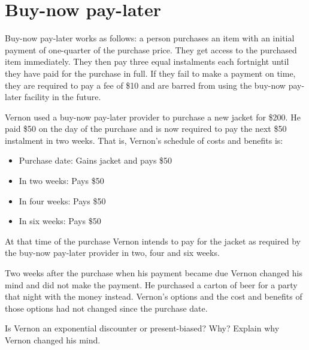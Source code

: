 \documentclass[
  letterpaper,
  DIV=11,
  numbers=noendperiod]{scrreprt}
\providecommand{\tightlist}{%
  \setlength{\itemsep}{0pt}\setlength{\parskip}{0pt}}\usepackage{longtable,booktabs,array}
\begin{document}
\hypertarget{buy-now-pay-later}{%
\section{Buy-now pay-later}\label{buy-now-pay-later}}

Buy-now pay-later works as follows: a person purchases an item with an
initial payment of one-quarter of the purchase price. They get access to
the purchased item immediately. They then pay three equal instalments
each fortnight until they have paid for the purchase in full. If they
fail to make a payment on time, they are required to pay a fee of \$10
and are barred from using the buy-now pay-later facility in the future.

Vernon used a buy-now pay-later provider to purchase a new jacket for
\$200. He paid \$50 on the day of the purchase and is now required to
pay the next \$50 instalment in two weeks. That is, Vernon's schedule of
costs and benefits is:

\begin{itemize}
\tightlist
\item
  Purchase date: Gains jacket and pays \$50
\item
  In two weeks: Pays \$50
\item
  In four weeks: Pays \$50
\item
  In six weeks: Pays \$50
\end{itemize}

At that time of the purchase Vernon intends to pay for the jacket as
required by the buy-now pay-later provider in two, four and six weeks.

Two weeks after the purchase when his payment became due Vernon changed
his mind and did not make the payment. He purchased a carton of beer for
a party that night with the money instead. Vernon's options and the cost
and benefits of those options had not changed since the purchase date.

Is Vernon an exponential discounter or present-biased? Why? Explain why
Vernon changed his mind.
\end{document}

